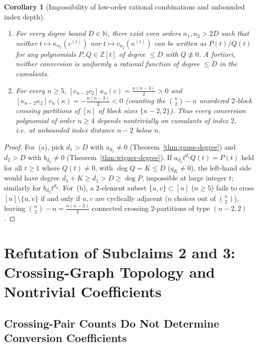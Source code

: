 \documentclass[11pt,a4paper]{article}
\newtheorem{corollary}[theorem]{Corollary}
\theoremstyle{definition}
\theoremstyle{remark}
\newcommand{\Z}{\mathbb{Z}}
\newcommand{\N}{\mathbb{N}}
\begin{document}
\begin{corollary}[Impossibility of low-order rational combinations and unbounded index depth]\label{cor:no-low-order}
\leavevmode
\begin{enumerate}
  \item[(a)] For every degree bound $D \in \N$, there exist even orders $n_1, n_2 > 2D$ such that neither $t \mapsto \kappa_{n_1}(c^{(t)})$ nor $t \mapsto c_{n_2}(\kappa^{(t)})$ can be written as $P(t)/Q(t)$ for any polynomials $P,Q \in \Z[t]$ of degree $\le D$ with $Q \not\equiv 0$. A fortiori, neither conversion is uniformly a rational function of degree $\le D$ in the cumulants.
  \item[(b)] For every $n \ge 5$, $[c_{n-2}c_2]\,\kappa_n(c) = \frac{n(n-3)}{2} > 0$ and $[\kappa_{n-2}\kappa_2]\,c_n(\kappa) = -\frac{n(n-3)}{2} < 0$ (counting the $\binom{n}{2} - n$ unordered $2$-block crossing partitions of $[n]$ of block sizes $\{n-2,2\}$). Thus every conversion polynomial of order $n \ge 4$ depends nontrivially on cumulants of index $2$, i.e.\ at unbounded index distance $n - 2$ below $n$.
\end{enumerate}
\end{corollary}

\begin{proof}
For~(a), pick $d_1 > D$ with $a_{d_1} \ne 0$ (Theorem~\ref{thm:gauss-degree}) and $d_2 > D$ with $b_{d_2} \ne 0$ (Theorem~\ref{thm:wigner-degree}). If $a_{d_1} t^{d_1} Q(t) = P(t)$ held for all $t \ge 1$ where $Q(t) \ne 0$, with $\deg Q = K \le D$ ($q_K \ne 0$), the left-hand side would have degree $d_1 + K \ge d_1 > D \ge \deg P$, impossible at large integer $t$; similarly for $b_{d_2} t^{d_2}$. For~(b), a $2$-element subset $\{u,v\} \subset [n]$ ($n \ge 5$) fails to cross $[n] \setminus \{u,v\}$ if and only if $u,v$ are cyclically adjacent ($n$ choices out of $\binom{n}{2}$), leaving $\binom{n}{2} - n = \frac{n(n-3)}{2}$ connected crossing $2$-partitions of type $(n-2,2)$.
\end{proof}

\section{Refutation of Subclaims 2 and 3: Crossing-Graph Topology and Nontrivial Coefficients}\label{sec:crossing}\label{sec:coeffs}

\subsection{Crossing-Pair Counts Do Not Determine Conversion Coefficients}
\end{document}
